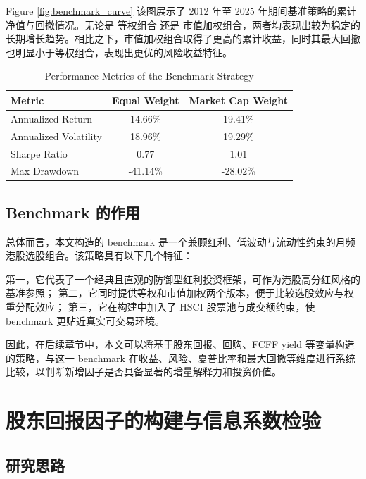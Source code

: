\documentclass[a4paper,10pt]{article}
\begin{document}
Figure \ref{fig:benchmark_curve} 该图展示了 2012 年至 2025 年期间基准策略的累计净值与回撤情况。无论是 等权组合 还是 市值加权组合，两者均表现出较为稳定的长期增长趋势。相比之下，市值加权组合取得了更高的累计收益，同时其最大回撤也明显小于等权组合，表现出更优的风险收益特征。

\begin{table}[H]
\centering
\caption{Performance Metrics of the Benchmark Strategy}
\label{tab:benchmark_performance}
\begin{tabular}{lcc}
\toprule
Metric & Equal Weight & Market Cap Weight \\
\midrule
Annualized Return & 14.66\% & 19.41\% \\
Annualized Volatility & 18.96\% & 19.29\% \\
Sharpe Ratio & 0.77 & 1.01 \\
Max Drawdown & -41.14\% & -28.02\% \\
\bottomrule
\end{tabular}
\end{table}





\subsection{Benchmark 的作用}

总体而言，本文构造的 benchmark 是一个兼顾红利、低波动与流动性约束的月频港股选股组合。该策略具有以下几个特征：

第一，它代表了一个经典且直观的防御型红利投资框架，可作为港股高分红风格的基准参照；  
第二，它同时提供等权和市值加权两个版本，便于比较选股效应与权重分配效应；  
第三，它在构建中加入了 HSCI 股票池与成交额约束，使 benchmark 更贴近真实可交易环境。

因此，在后续章节中，本文可以将基于股东回报、回购、FCFF yield 等变量构造的策略，与这一 benchmark 在收益、风险、夏普比率和最大回撤等维度进行系统比较，以判断新增因子是否具备显著的增量解释力和投资价值。






\section{股东回报因子的构建与信息系数检验}

\subsection{研究思路}
\end{document}
